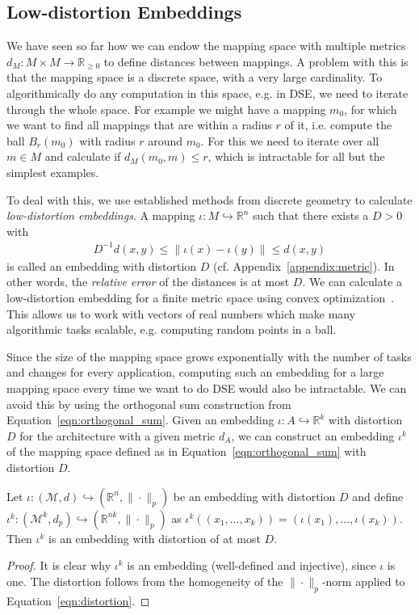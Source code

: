 \subsection{Low-distortion Embeddings}

We have seen so far how we can endow the mapping space with multiple metrics $d_M : M \times M \rightarrow \mathbb{R}_{\geq 0}$ to define distances between mappings.
A problem with this is that the mapping space is a discrete space, with a very large cardinality.
To algorithmically do any computation in this space, e.g. in \ac{DSE}, we need to iterate through the whole space.
For example we might have a mapping $m_0$, for which we want to find all mappings that are within a radius $r$ of it, i.e. compute the ball $B_r(m_0)$ with radius $r$ around $m_0$.
For this we need to iterate over all $m \in M$ and calculate if $d_M(m_0,m) \leq r$, which is intractable for all but the simplest examples.

To deal with this, we use established methods from discrete geometry to calculate \emph{low-distortion embeddings}.
A mapping $\iota : M \hookrightarrow \mathbb{R}^n$ such that there exists a $D > 0$ with
\begin{align}\label{eqn:distortion} D^{-1} d(x,y) \leq \| \iota(x) - \iota(y) \| \leq d(x,y) \end{align}
is called an embedding with distortion $D$ (cf. Appendix~\ref{appendix:metric}).
In other words, the \emph{relative error} of the distances is at most $D$.
We can calculate a low-distortion embedding for a finite metric space using convex optimization~\cite{matouvsek}.
This allows us to work with vectors of real numbers which make many algorithmic tasks scalable, e.g. computing random points in a ball.

Since the size of the mapping space grows exponentially with the number of tasks and changes for every application, computing such an embedding for a large mapping space every time we want to do \ac{DSE} would also be intractable.
We can avoid this by using the orthogonal sum construction from Equation~\ref{eqn:orthogonal_sum}.
Given an embedding $\iota : A \hookrightarrow \mathbb{R}^k$ with distortion $D$ for the architecture with a given metric $d_A$, we can construct an embedding $\iota^k$ of the mapping space defined as in Equation~\ref{eqn:orthogonal_sum} with distortion $D$.
\begin{theorem}
\label{thm:iotad}
Let $\iota: (\mathcal{M}, d) \hookrightarrow (\mathbb{R}^n, \| \cdot \|_p)$ be an embedding with distortion $D$ and define $\iota^{k} : (\mathcal{M}^k,d_p) \hookrightarrow (\mathbb{R}^{nk}, \| \cdot \|_p)$ as
$\iota^k ( (x_1,\ldots,x_k)) = (\iota(x_1),\ldots,\iota(x_k))$. Then $\iota^k$ is an embedding with distortion of at most $D$.
\begin{proof}
It is clear why $\iota^k$ is an embedding (well-defined and injective), since $\iota$ is one.
The distortion follows from the homogeneity of the $\| \cdot \|_p$-norm applied to Equation~\ref{eqn:distortion}.
\end{proof}
\end{theorem}
	  
